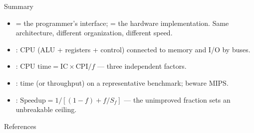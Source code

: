 \documentclass[aspectratio=169]{beamer}
\begin{document}
\begin{frame}{Summary}
  \begin{itemize}
    \item {} = the programmer's interface; 
      = the hardware implementation. Same architecture, different
      organization, different speed.
    \item {}: CPU (ALU + registers + control) connected to
      memory and I/O by buses.
    \item {}: $\text{CPU time} = \text{IC} \times
      \text{CPI} / f$ --- three independent factors.
    \item {}: time (or throughput) on a representative
      benchmark; beware MIPS.
    \item {}: $\text{Speedup} = 1\big/[(1-f) + f/S_f]$ --- the
      unimproved fraction sets an unbreakable ceiling.
  \end{itemize}
\end{frame}

\begin{frame}{References}
  \footnotesize
  
  
\end{frame}
\end{document}
